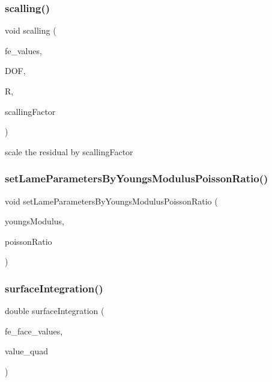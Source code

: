 \subsubsection{\texorpdfstring{scalling()}{scalling()}}
{\footnotesize\ttfamily void scalling (\begin{DoxyParamCaption}\item[{const F\+E\+Values$<$ dim $>$ \&}]{fe\+\_\+values,  }\item[{unsigned int}]{D\+OF,  }\item[{Table$<$ 1, Sacado\+::\+Fad\+::\+D\+Fad$<$ double $>$ $>$ \&}]{R,  }\item[{double}]{scalling\+Factor }\end{DoxyParamCaption})}

scale the residual by scalling\+Factor \mbox{\label{class_residual_a74a86942f009e483e946ac0a0036bd71}} 
\subsubsection{\texorpdfstring{setLameParametersByYoungsModulusPoissonRatio()}{setLameParametersByYoungsModulusPoissonRatio()}}
{\footnotesize\ttfamily void set\+Lame\+Parameters\+By\+Youngs\+Modulus\+Poisson\+Ratio (\begin{DoxyParamCaption}\item[{double}]{youngs\+Modulus,  }\item[{double}]{poisson\+Ratio }\end{DoxyParamCaption})}

\mbox{\label{class_residual_ac48cd0a04f0d2f91a23e60135652d938}} 
\subsubsection{\texorpdfstring{surfaceIntegration()}{surfaceIntegration()}\hspace{0.1cm}{\footnotesize\ttfamily [1/6]}}
{\footnotesize\ttfamily double surface\+Integration (\begin{DoxyParamCaption}\item[{const F\+E\+Face\+Values$<$ dim $>$ \&}]{fe\+\_\+face\+\_\+values,  }\item[{double}]{value\+\_\+quad }\end{DoxyParamCaption})}

